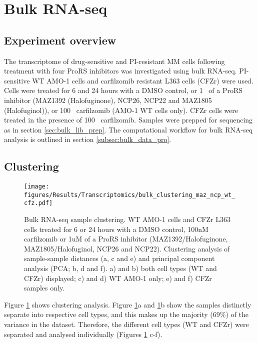 \clearpage

\section{Bulk RNA-seq}

\subsection{Experiment overview}
The transcriptome of drug-sensitive and PI-resistant MM cells following treatment with four ProRS inhibitors was investigated using bulk RNA-seq.
PI-sensitive WT AMO-1 cells and carfilzomib resistant L363 cells (CFZr) were used.
Cells were treated for 6 and 24 hours with a DMSO control, or 1\si{\micro\Molar} of a ProRS inhibitor (MAZ1392 (Halofuginone), NCP26, NCP22 and MAZ1805 (Halofuginol)), or 100\si{\nano\Molar} carfilzomib (AMO-1 WT cells only).
CFZr cells were treated in the presence of 100\si{\nano\Molar} carfilzomib.
Samples were prepped for sequencing as in section \ref{sec:bulk_lib_prep}.
The computational workflow for bulk RNA-seq analysis is outlined in section \ref{subsec:bulk_data_pro}.

\subsection{Clustering}

\begin{figure}[p]
\centering
\texttt{[image: figures/Results/Transcriptomics/bulk\_clustering\_maz\_ncp\_wt\_cfz.pdf]}
\caption[Bulk RNA-seq sample clustering]{Bulk RNA-seq sample clustering.
WT AMO-1 cells and CFZr L363 cells treated for 6 or 24 hours with a DMSO control, 100nM carfilzomib or 1uM of a ProRS inhibitor (MAZ1392/Halofuginone, MAZ1805/Halofuginol, NCP26 and NCP22).
Clustering analysis of sample-sample distances (a, c and e) and principal component analysis (PCA; b, d and f).
a) and b) both cell types (WT and CFZr) displayed; c) and d) WT AMO-1 only; e) and f) CFZr samples only.
}
\label{fig:clustering_bulk}\end{figure}

Figure \ref{fig:clustering_bulk} shows clustering analysis.
Figure \ref{fig:clustering_bulk}a and \ref{fig:clustering_bulk}b show the samples distinctly separate into respective cell types, and this makes up the majority (69\%) of the variance in the dataset.
Therefore, the different cell types (WT and CFZr) were separated and analysed individually (Figures \ref{fig:clustering_bulk} c-f).


